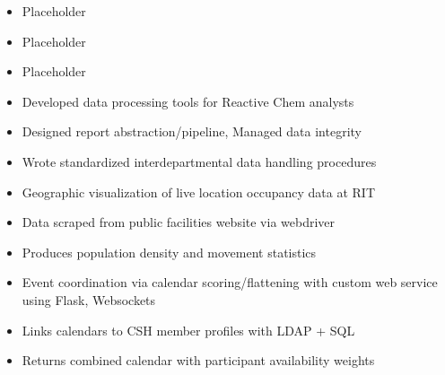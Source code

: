 \documentclass[10pt,a4paper,ragged2e,withhyper]{altacv}
\begin{document}
\begin{paracol}{2}


\begin{itemize}
    \item Placeholder
    \item Placeholder
    \item Placeholder
\end{itemize}

\divider

\begin{itemize}
    \item Developed data processing tools for Reactive Chem analysts
    \item Designed report abstraction/pipeline, Managed data integrity
    \item Wrote standardized interdepartmental data handling procedures
\end{itemize}


\begin{itemize}
    \item Geographic visualization of live location occupancy data at RIT
    \item Data scraped from public facilities website via webdriver
    \item Produces population density and movement statistics
\end{itemize}

\divider

\begin{itemize}
    \item Event coordination via calendar scoring/flattening with custom web service using Flask, Websockets
    \item Links calendars to CSH member profiles with LDAP + SQL
    \item Returns combined calendar with participant availability weights
\end{itemize}


\end{paracol}
\end{document}
